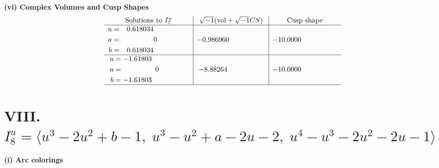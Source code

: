 \documentclass[1p]{elsarticle_modified}
\theoremstyle{definition}
\newcommand{\I}{\sqrt{-1}}
\begin{document}
\newpage\flushleft \textbf{(vi) Complex Volumes and Cusp Shapes}
$$\begin{array}{c|c|c}  
\text{Solutions to }I^u_{7}& \I (\text{vol} + \sqrt{-1}CS) & \text{Cusp shape}\\
 \hline 
\begin{aligned}
u &= \phantom{-}0.618034\phantom{ +0.000000I} \\
a &= \phantom{-0.000000 } 0 \\
b &= \phantom{-}0.618034\phantom{ +0.000000I}\end{aligned}
 & -0.986960\phantom{ +0.000000I} & -10.0000\phantom{ +0.000000I} \\ \hline\begin{aligned}
u &= -1.61803\phantom{ +0.000000I} \\
a &= \phantom{-0.000000 } 0 \\
b &= -1.61803\phantom{ +0.000000I}\end{aligned}
 & -8.88264\phantom{ +0.000000I} & -10.0000\phantom{ +0.000000I}\\
 \hline 
 \end{array}$$\newpage\newpage\renewcommand{\arraystretch}{1}
\centering \section*{VIII. $I^u_{8}= \langle u^3-2 u^2+b-1,\;u^3- u^2+a-2 u-2,\;u^4- u^3-2 u^2-2 u-1 \rangle$}
\flushleft \textbf{(i) Arc colorings}\\
\end{document}
